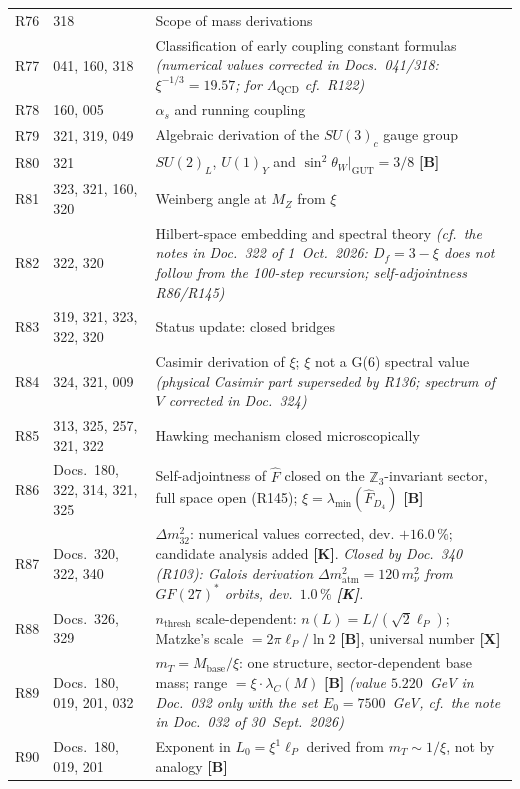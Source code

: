 \begin{longtable}{@{}p{0.9cm}p{3.1cm}p{10.2cm}@{}}
R76 & 318 & Scope of mass derivations \\
R77 & 041, 160, 318 & Classification of early coupling constant formulas \emph{(numerical values corrected in Docs.~041/318: $\xi^{-1/3}=19.57$; for $\Lambda_{\mathrm{QCD}}$ cf.\ R122)} \\
R78 & 160, 005 & $\alpha_s$ and running coupling \\
R79 & 321, 319, 049 & Algebraic derivation of the $SU(3)_c$ gauge group \\
R80 & 321 & $SU(2)_L$, $U(1)_Y$ and $\sin^2\theta_W|_{\mathrm{GUT}}=3/8$ \textbf{[B]} \\
R81 & 323, 321, 160, 320 & Weinberg angle at $M_Z$ from $\xi$ \\
R82 & 322, 320 & Hilbert-space embedding and spectral theory \emph{(cf.\ the notes in Doc.~322 of 1~Oct.~2026: $D_f=3-\xi$ does not follow from the 100-step recursion; self-adjointness R86/R145)} \\
R83 & 319, 321, 323, 322, 320 & Status update: closed bridges \\
R84 & 324, 321, 009 & Casimir derivation of $\xi$; $\xi$ not a G(6) spectral value \emph{(physical Casimir part superseded by R136; spectrum of $V$ corrected in Doc.~324)} \\
R85 & 313, 325, 257, 321, 322 & Hawking mechanism closed microscopically \\
R86 & Docs.~180, 322, 314, 321, 325 & Self-adjointness of $\hat{F}$ closed on the $\mathbb{Z}_3$-invariant sector, full space open (R145); $\xi = \lambda_{\min}(\hat{F}_{D_4})$ \textbf{[B]} \\
R87 & Docs.~320, 322, 340 & $\Delta m_{32}^2$: numerical values corrected, dev. $+16.0\,\%$; candidate analysis added \textbf{[K]}. \emph{Closed by Doc.~340 (R103): Galois derivation $\Delta m^2_\text{atm}=120\,m_\nu^2$ from $GF(27)^*$ orbits, dev.\ $1.0\,\%$ \textbf{[K]}.} \\
R88 & Docs.~326, 329 & $n_{\mathrm{thresh}}$ scale-dependent: $n(L)=L/(\sqrt{2}\ell_P)$; Matzke's scale $=2\pi\ell_P/\ln 2$ \textbf{[B]}, universal number \textbf{[X]} \\
R89 & Docs.~180, 019, 201, 032 & $m_T = M_\mathrm{base}/\xi$: one structure, sector-dependent base mass; range $=\xi\cdot\lambda_C(M)$ \textbf{[B]} \emph{(value $5.220$~GeV in Doc.~032 only with the set $E_0=7500$~GeV, cf.\ the note in Doc.~032 of 30~Sept.~2026)} \\
R90 & Docs.~180, 019, 201 & Exponent in $L_0 = \xi^1\ell_P$ derived from $m_T\sim1/\xi$, not by analogy \textbf{[B]} \\

\end{longtable}
